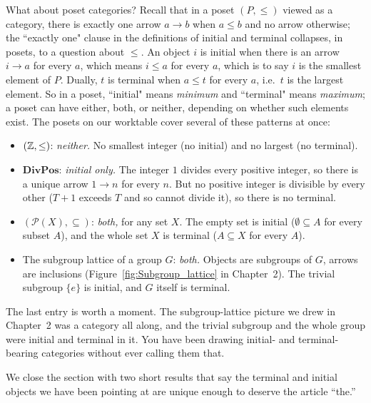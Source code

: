 \noindent What about poset categories? Recall that in a poset $(P, \leq)$
viewed as a category, there is exactly one arrow $a \to b$ when $a \leq b$
and no arrow otherwise; the ``exactly one" clause in the definitions of
initial and terminal collapses, in posets, to a question about $\leq$. An
object $i$ is initial when there is an arrow $i \to a$ for every $a$,
which means $i \leq a$ for every $a$, which is to say $i$ is the smallest
element of $P$. Dually, $t$ is terminal when $a \leq t$ for every $a$,
i.e.\ $t$ is the largest element. So in a poset, ``initial" means
\textit{minimum} and ``terminal" means \textit{maximum}; a poset can have
either, both, or neither, depending on whether such elements exist. The
posets on our worktable cover several of these patterns at once:
\begin{itemize}
    \item $({\mathbb{Z}}, \leq)$: \textit{neither.} No smallest integer (no
    initial) and no largest (no terminal).
    \item $\mathbf{DivPos}$: \textit{initial only.} The integer $1$
    divides every positive integer, so there is a unique arrow $1 \to n$
    for every $n$. But no positive integer is divisible by every other
    ($T + 1$ exceeds $T$ and so cannot divide it), so there is no
    terminal.
    \item $(\mathcal{P}(X), \subseteq)$: \textit{both,} for any set $X$.
    The empty set is initial ($\emptyset \subseteq A$ for every subset
    $A$), and the whole set $X$ is terminal ($A \subseteq X$ for every
    $A$).
    \item The subgroup lattice of a group $G$: \textit{both.} Objects
    are subgroups of $G$, arrows are inclusions
    (Figure~\ref{fig:Subgroup_lattice} in Chapter~2). The trivial
    subgroup $\{e\}$ is initial, and $G$ itself is terminal.
\end{itemize}

\noindent The last entry is worth a moment. The subgroup-lattice picture
we drew in Chapter~2 was a category all along, and the trivial subgroup
and the whole group were initial and terminal in it. You have been drawing
initial- and terminal-bearing categories without ever calling them that.

\noindent We close the section with two short results that say the
terminal and initial objects we have been pointing at are unique enough
to deserve the article ``the.''

